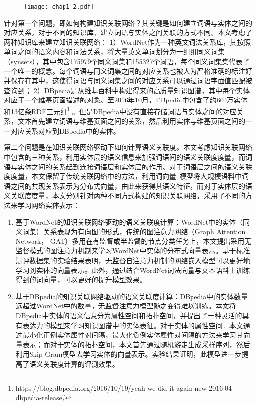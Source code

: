 \begin{figure}
    \centerline{\texttt{[image: chap1-2.pdf]}}
    \label{chap1-2}
\end{figure}

针对第一个问题，即如何构建知识关联网络？其关键是如何建立词语与实体之间的对应关系。对于不同的知识库，建立词语与实体之间关联的方式不同。本文考虑了两种知识库来建立知识关联网络：
1）WordNet作为一种英文词法关系库，其按照单词之间的语义内容和词法关系，将大量英文单词划分为一组组同义词集（synsets），其中包含175979个同义词集和155327个词语，每个同义词集集代表了一个唯一的概念。每个词语与同义词集之间的对应关系也被人为严格准确的标注好并保存在其中，这使得词语与同义词集之间的对应关系可以通过词语字面值匹配被查询到；
2）DBpedia是从维基百科中构建得来的高质量知识图谱，其中每个实体对应于一个维基页面描述的对象。至2016年10月，DBpedia中包含了约600万实体和13亿条RDF三元组\footnote{https://blog.dbpedia.org/2016/10/19/yeah-we-did-it-again-new-2016-04-dbpedia-release/} 。但是DBpedia中没有直接存储词语与实体之间的对应关系，文本首先建立词语与维基页面之间的关系，然后利用实体与维基页面之间的一一对应关系对应到DBpedia中的实体。

第二个问题是在知识关联网络驱动下如何计算语义关联度。本文考虑知识关联网络中包含的三种关系，利用实体层的语义信息来加强词语间的语义关联度度量，而词语与实体之间的关系起到连接词语层和实体层的作用。对于词语层之间的语义关联度度量，本文保留了传统关联网络中的方法，利用词向量~\cite{corr/Mikolov13, emnlp/PenningtonSM14}模型将大规模语料中词语之间的共现关系表示为分布式向量，由此来获得其语义特征。而对于实体层的语义关联度度量，本文分别针对两种不同方式构建的知识关联网络，采用了不同的方法来学习网络实体表示：
\begin{enumerate}
    \item 基于WordNet的知识关联网络驱动的语义关联度计算：WordNet中的实体（同义词集）关系表现为有向图的形式，传统的图注意力网络（Graph Attention Network， GAT）\cite{iclr/VelickovicCCRLB18}多用在有监督或半监督的节点分类任务上，本文提出采用无监督模式的图注意力机制来学习WordNet中实体的分布式向量表示。基于标准测评数据集的实验结果表明，无监督自注意力机制的网络嵌入模型可以更好地学习到实体的向量表示。此外，通过结合WordNet词法向量与文本语料上训练得到的词向量，可以更好的提升模型效果。
    \item 基于DBpedia的知识关联网络驱动的语义关联度计算：DBpedia中的实体数量远超过WordNet中的数量，无监督注意力模型随之变得难以训练。本文将DBpedia中实体的语义信息分为属性空间和拓扑空间，并提出了一种灵活的具有表达力的模型来学习知识图谱中的实体表征。对于实体的属性空间，本文通过最小化正例实体属性对间隔，最大化负例实体属性对间隔的方法来学习其向量表示；而对于实体的拓扑空间，本文首先通过随机游走生成采样序列，然后利用Skip-Gram\cite{corr/Mikolov13}模型去学习实体的向量表示。实验结果证明，此模型进一步提高了语义关联度计算的评测效果。
\end{enumerate}

